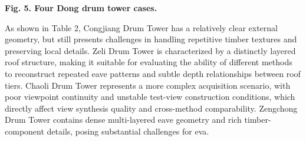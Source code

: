 \textbf{Fig. 5. Four Dong drum tower cases.}

As shown in Table 2, Congjiang Drum Tower has a relatively clear
external geometry, but still presents challenges in handling repetitive
timber textures and preserving local details. Zeli Drum Tower is
characterized by a distinctly layered roof structure, making it suitable
for evaluating the ability of different methods to reconstruct repeated
eave patterns and subtle depth relationships between roof tiers. Chaoli
Drum Tower represents a more complex acquisition scenario, with poor
viewpoint continuity and unstable test-view construction conditions,
which directly affect view synthesis quality and cross-method
comparability. Zengchong Drum Tower contains dense multi-layered eave
geometry and rich timber-component details, posing substantial
challenges for eva.

